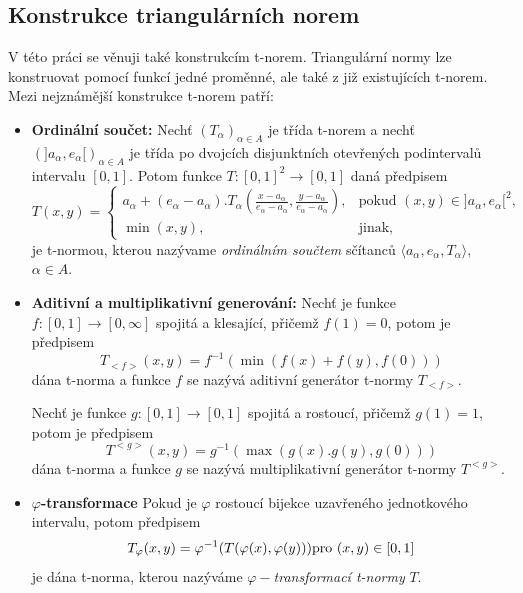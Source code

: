 \subsection{Konstrukce triangulárních norem}

V t\'eto pr\'aci se v\v enuji tak\'e konstrukc\'im t-norem. Triangul\'arn\'i normy lze konstruovat pomoc\'i funkc\'i jedn\'e prom\v enn\'e, ale tak\'e z ji\v z existuj\'ic\'ich t-norem. Mezi nejznámější konstrukce t-norem patří:
\begin{itemize}
    \item \textbf{Ordinální součet:}
    \cite{KMP}
        Nech\v t $(T_\alpha)_{\alpha \in A}$ je třída t-norem a
        nech\v t $(]a_\alpha,e_\alpha[)_{\alpha \in A}$ je třída po dvojcích
        disjunktních otevřených podinterval\r u intervalu $[0,1].$ Potom funkce
        \hbox{$T:[0,1]^2\rightarrow [0,1]$} daná předpisem
        $$T(x,y)=\begin{cases} a_\alpha + (e_\alpha - a_\alpha ).T_\alpha (\frac
        {x-a_\alpha}{e_\alpha - a_\alpha}, \frac {y-a_\alpha}{e_\alpha - a_\alpha}),
        &\mbox {pokud $(x,y) \in ]a_\alpha ,e_\alpha [^2$,}
        \\\min(x,y), &\mbox {jinak,} \end{cases}$$
        je t-normou, kterou nazývame {\em ordinálním součtem} sčítanc\r u $\langle a_\alpha ,e_\alpha
        ,T_\alpha \rangle,$ \mbox{$ \alpha \in A.$}

    \item \textbf{Aditivní a multiplikativní generování:}
        \cite{KMP}
        Nech\v t je funkce $f:[0,1] \to [0,\infty]$ spojitá a klesající, přičemž
        $f(1)=0$, potom je předpisem
        $$ T_{<f>}(x,y)=f^{-1}(\min(f(x)+f(y),f(0)))$$
        dána t-norma a funkce $f$ se nazývá aditivní generátor t-normy
        $T_{<f>}.$
        
        Nech\v t je funkce $g:[0,1] \to [0,1]$ spojitá a rostoucí, přičemž
        $g(1)=1$, potom je předpisem
        $$ T^{<g>}(x,y)=g^{-1}(\max(g(x).g(y),g(0)))$$
        dána t-norma a funkce $g$ se nazývá multiplikativní generátor t-normy
        $T^{<g>}.$
    \item \textbf{$\varphi$-transformace}
        \cite{KMP}
        Pokud je $\varphi$ rostoucí bijekce uzavřeného jednotkového intervalu, potom
        předpisem
        $$T_\varphi (x,y)=\varphi ^{-1}(T(\varphi(x),\varphi(y)))\space \text {pro $(x,y)
        \in [0,1]$}$$
        je dána t-norma, kterou nazýváme $\varphi-${\em transformací t-normy}
        $T.$

\end{itemize}

